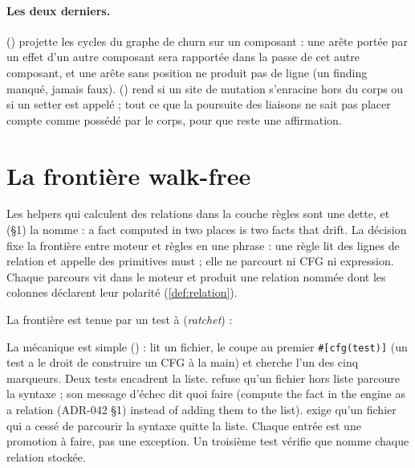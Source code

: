 \paragraph{Les deux derniers.}  () projette les cycles du graphe de churn sur un composant : une arête portée par un effet d'un autre composant sera rapportée dans la passe de cet autre composant, et une arête sans position ne produit pas de ligne (un finding manqué, jamais faux).  () rend  si un site de mutation s'enracine hors du corps ou si un setter est appelé ; tout ce que la poursuite des liaisons ne sait pas placer compte comme possédé par le corps, pour que  reste une affirmation.

\section{La frontière \og walk-free\fg}
\label{sec:api-regles-walk-free}

Les helpers qui calculent des relations dans la couche règles sont une dette, et  (§1) la nomme : \og a fact computed in two places is two facts that drift\fg. La décision fixe la frontière entre moteur et règles en une phrase : une règle lit des lignes de relation et appelle des primitives must ; elle ne parcourt ni CFG ni expression. Chaque parcours vit dans le moteur et produit une relation nommée dont les colonnes déclarent leur polarité (\cref{def:relation}).

La frontière est tenue par un test à  (\emph{ratchet}) :


La mécanique est simple () :  lit un fichier, le coupe au premier \texttt{\#[cfg(test)]} (un test a le droit de construire un CFG à la main) et cherche l'un des cinq marqueurs. Deux tests encadrent la liste.  refuse qu'un fichier hors liste parcoure la syntaxe ; son message d'échec dit quoi faire (\og compute the fact in the engine as a relation (ADR-042 §1) instead of adding them to the list\fg).  exige qu'un fichier qui a cessé de parcourir la syntaxe quitte la liste. Chaque entrée est une promotion à faire, pas une exception. Un troisième test vérifie que  nomme chaque relation stockée.

